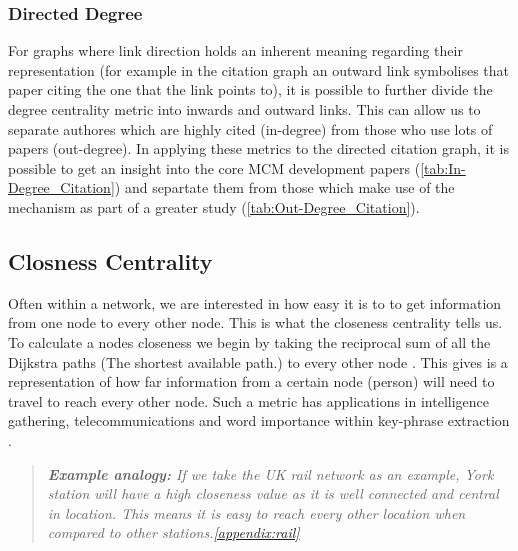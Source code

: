 % 
% 

\subsubsection*{Directed Degree}
For graphs where link direction holds an inherent meaning regarding their representation (for example in the citation graph an outward link symbolises that paper citing the one that the link points to), it is possible to further divide the degree centrality metric into inwards and outward links. This can allow us to separate authores which are highly cited (in-degree) from those who use lots of papers (out-degree). In applying these metrics to the directed citation graph, it is possible to get an insight into the core MCM development papers (\autoref{tab:In-Degree_Citation}) and separtate them from those which make use of the mechanism as part of a greater study (\autoref{tab:Out-Degree_Citation}).








\subsection{Closness Centrality}
Often within a network, we are interested in how easy it is to to get information from one node to every other node. This is what the closeness centrality tells us. To calculate a nodes closeness we begin by taking the reciprocal sum of all the Dijkstra paths (The shortest available path.) to every other node \citep{closeness-book,closeness}. 
This gives is a representation of how far information from a certain node (person) will need to travel to reach every other node. Such a metric has applications in intelligence gathering, telecommunications and word importance within key-phrase extraction \citep{terror,examples_centrality,phrase}.

\begin{quote}
\textit{
\textbf{Example analogy:} If we take the UK rail network as an example, York station will have a high closeness value as it is well connected and central in location. This means it is easy to reach every other location when compared to other stations.\autoref{appendix:rail}
}
\end{quote}

